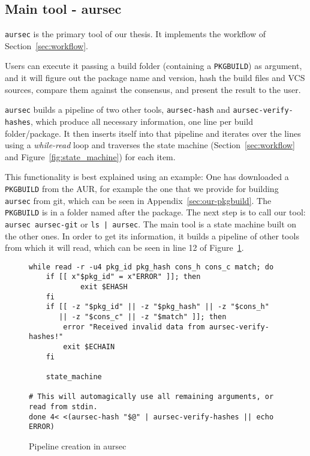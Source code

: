 \subsection{Main tool - aursec}
\label{sec:aursec}
\texttt{aursec} is the primary tool of our thesis. It implements the workflow of Section~\ref{sec:workflow}.

Users can execute it passing a build folder (containing a \texttt{PKGBUILD}) as argument, and it will figure out the package name and version, hash the build files and VCS sources, compare them against the consensus, and present the result to the user.

\texttt{aursec} builds a pipeline of two other tools, \texttt{aursec-hash} and \texttt{aursec-verify-hashes}, which produce all necessary information, one line per build folder/package.
It then inserts itself into that pipeline and iterates over the lines using a \emph{while-read} loop and traverses the state machine (Section~\ref{sec:workflow} and Figure~\ref{fig:state_machine}) for each item.

This functionality is best explained using an example: One has downloaded a \texttt{PKGBUILD} from the AUR, for example the one that we provide for building \texttt{aursec} from git, which can be seen in Appendix~\ref{sec:our-pkgbuild}. The \texttt{PKGBUILD} is in a folder named after the package.
The next step is to call our tool: \texttt{aursec aursec-git} or \texttt{ls | aursec}.
The main tool is a state machine built on the other ones.
In order to get its information, it builds a pipeline of other tools from which it will read, which can be seen in line 12 of Figure~\ref{src:aursec-pipeline}.

\begin{figure}
	\begin{verbatim}
while read -r -u4 pkg_id pkg_hash cons_h cons_c match; do
    if [[ x"$pkg_id" = x"ERROR" ]]; then
            exit $EHASH
    fi
    if [[ -z "$pkg_id" || -z "$pkg_hash" || -z "$cons_h"
       || -z "$cons_c" || -z "$match" ]]; then
        error "Received invalid data from aursec-verify-hashes!"
        exit $ECHAIN
    fi

    state_machine

# This will automagically use all remaining arguments, or read from stdin.
done 4< <(aursec-hash "$@" | aursec-verify-hashes || echo ERROR)
	\end{verbatim}
	\caption{Pipeline creation in aursec}
	\label{src:aursec-pipeline}
\end{figure}

